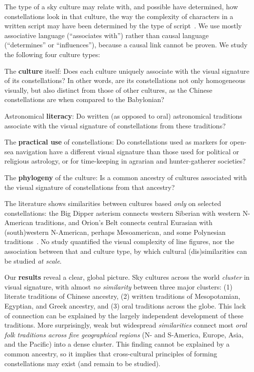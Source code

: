 \documentclass[10pt]{article}
\begin{document}
The type of a sky culture may relate with, and possible have determined, how constellations look in that culture, the way the complexity of characters in a written script may have been determined by the type of script~\cite{miton2021graphic}. We use mostly associative language (``associates with'') rather than causal language (``determines'' or ``influences''), because a causal link cannot be proven. We study the following four culture types:
%
\begin{description}
	\setlength\itemsep{0mm}
	\item[I.1] The {\bf culture} itself: Does each culture uniquely associate with the visual signature of its constellations? In other words, are its constellations not only homogeneous visually, but also distinct from those of other cultures, as the Chinese constellations are when compared to the Babylonian?
	\item[I.2] Astronomical {\bf literacy}: Do written (as opposed to oral) astronomical traditions associate with the visual signature of constellations from these traditions?
	\item[I.3] The {\bf practical use} of constellations: Do constellations used as markers for open-sea navigation have a different visual signature than those used for political or religious astrology, or for time-keeping in agrarian and hunter-gatherer societies?
	\item[I.4] The {\bf phylogeny} of the culture: Is a common ancestry of cultures associated with the visual signature of constellations from that ancestry?
\end{description}

The literature shows similarities between cultures based \emph{only} on selected constellations: the Big Dipper asterism connects western Siberian with western N-American traditions, and Orion's Belt connects central Eurasian with (south)western N-American, perhaps Mesoamerican, and some Polynesian traditions~\cite{berezkin2005cosmic,miller1997stars,kelley2005exploring}. No study quantified the visual complexity of line figures, nor the association between that and culture type, by which cultural (dis)similarities can be studied \emph{at scale}. 

Our {\bf results} reveal a clear, global picture. Sky cultures across the world \emph{cluster} in visual signature, with almost \emph{no similarity} between three major clusters: (1) literate traditions of Chinese ancestry, (2) written traditions of Mesopotamian, Egyptian, and Greek ancestry, and (3) oral traditions across the globe. This lack of connection can be explained by the largely independent development of these traditions. More surprisingly, weak but widespread \emph{similarities} connect most \emph{oral folk traditions across five geographical regions} (N- and S-America, Europe, Asia, and the Pacific) into a dense cluster. This finding cannot be explained by a common ancestry, so it implies that cross-cultural principles of forming constellations may exist (and remain to be studied).
\end{document}
